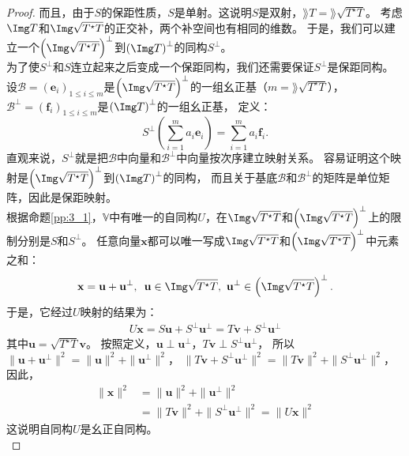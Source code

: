 \documentclass[12pt,UTF8]{ctexbook}
\begin{document}
\begin{proof}
    而且，由于$S$的保距性质，$S$是单射。这说明$S$是双射，$\rang T = \rang \sqrt{T^\star T}$。
    考虑$\Img T$和$\Img \sqrt{T^\star T}$的正交补，两个补空间也有相同的维数。
    于是，我们可以建立一个$\left(\Img \sqrt{T^\star T}\right)^\perp$到$\left(\Img T\right)^\perp$的同构$S^\perp$。\\
    为了使$S^\perp$和$S$连立起来之后变成一个保距同构，我们还需要保证$S^\perp$是保距同构。
    设$\mathcal{B} = (\mathbf{e}_i)_{1 \leqslant i \leqslant m}$是$\left(\Img \sqrt{T^\star T}\right)^\perp$的一组幺正基（$m = \rang \sqrt{T^\star T}$），
    $\mathcal{B}^\perp = (\mathbf{f}_i)_{1 \leqslant i \leqslant m}$是$\left(\Img T\right)^\perp$的一组幺正基，
    定义：
    $$ S^\perp(\sum_{i=1}^m a_i \mathbf{e}_i) = \sum_{i=1}^m a_i \mathbf{f}_i. $$
    直观来说，$S^\perp$就是把$\mathcal{B}$中向量和$\mathcal{B}^\perp$中向量按次序建立映射关系。
    容易证明这个映射是$\left(\Img \sqrt{T^\star T}\right)^\perp$到$\left(\Img T\right)^\perp$的同构，
    而且关于基底$\mathcal{B}$和$\mathcal{B}^\perp$的矩阵是单位矩阵，因此是保距映射。\\
    根据命题\ref{pp:3_1}，$\mathbb{V}$中有唯一的自同构$U$，在$\Img \sqrt{T^\star T}$和$\left(\Img \sqrt{T^\star T}\right)^\perp$上的限制分别是$S$和$S^\perp$。
    任意向量$\mathbf{x}$都可以唯一写成$\Img \sqrt{T^\star T}$和$\left(\Img \sqrt{T^\star T}\right)^\perp$中元素之和：
    $$ \mathbf{x} = \mathbf{u} + \mathbf{u}^\perp, \,\,\, \mathbf{u} \in \Img \sqrt{T^\star T} , \,\, \mathbf{u}^\perp \in \left(\Img \sqrt{T^\star T}\right)^\perp. $$
    于是，它经过$U$映射的结果为：
    \begin{align*}
        U\mathbf{x} = S\mathbf{u} + S^\perp\mathbf{u}^\perp = T\mathbf{v} + S^\perp\mathbf{u}^\perp 
    \end{align*}
    其中$\mathbf{u} = \sqrt{T^\star T} \mathbf{v}$。
    按照定义，$\mathbf{u} \perp \mathbf{u}^\perp$，$T\mathbf{v} \perp S^\perp\mathbf{u}^\perp$，
    所以$\| \mathbf{u} + \mathbf{u}^\perp \|^2 = \| \mathbf{u} \|^2 + \| \mathbf{u}^\perp \|^2$，
    $\| T\mathbf{v} + S^\perp\mathbf{u}^\perp \|^2 = \| T\mathbf{v} \|^2 + \| S^\perp\mathbf{u}^\perp \|^2$，
    因此，
    \begin{align*}
        \| \mathbf{x} \|^2 &= \| \mathbf{u} \|^2 + \| \mathbf{u}^\perp \|^2  \\
        &= \| T\mathbf{v} \|^2 + \| S^\perp\mathbf{u}^\perp \|^2 = \| U\mathbf{x} \|^2  
    \end{align*}
    这说明自同构$U$是幺正自同构。\\
\end{proof}
\end{document}
